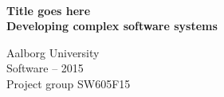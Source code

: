 \thispagestyle{empty}
\begin{center}
\vspace*{\fill}
    \hrulefill\newline\\
    \vspace*{0.35cm}
    {\Large \textbf{Title goes here}}\\
    \vspace*{0.5cm}
    {\large \textbf{Developing complex software systems}}\\
    \vspace*{0.35cm}
    \hrulefill\newline
    
    Aalborg University\\
    Software -- 2015\\
    Project group SW605F15\\
\end{center}

\vfill

\newpage\null\thispagestyle{empty}\newpage

